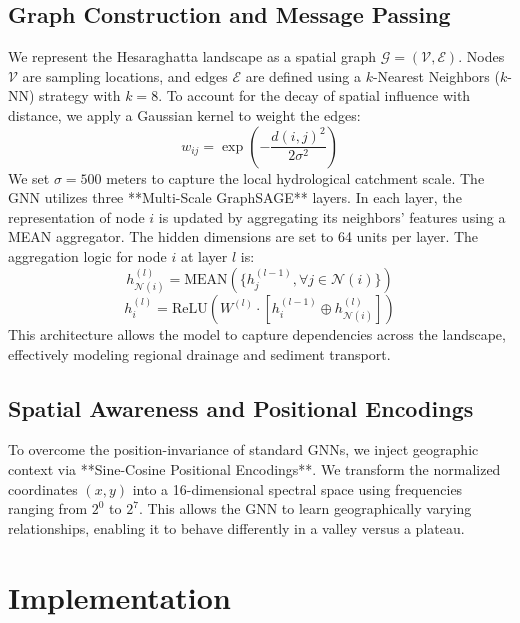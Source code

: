 \documentclass[conference]{IEEEtran}
\begin{document}
\subsection{Graph Construction and Message Passing}
We represent the Hesaraghatta landscape as a spatial graph $\mathcal{G} = (\mathcal{V}, \mathcal{E})$. Nodes $\mathcal{V}$ are sampling locations, and edges $\mathcal{E}$ are defined using a $k$-Nearest Neighbors ($k$-NN) strategy with $k=8$. To account for the decay of spatial influence with distance, we apply a Gaussian kernel to weight the edges:
\begin{equation}
w_{ij} = \exp\left(-\frac{d(i, j)^2}{2\sigma^2}\right)
\end{equation}
We set $\sigma=500$ meters to capture the local hydrological catchment scale. The GNN utilizes three **Multi-Scale GraphSAGE** layers. In each layer, the representation of node $i$ is updated by aggregating its neighbors' features using a MEAN aggregator. The hidden dimensions are set to 64 units per layer. The aggregation logic for node $i$ at layer $l$ is:
\begin{equation}
h_{\mathcal{N}(i)}^{(l)} = \text{MEAN}(\{h_j^{(l-1)}, \forall j \in \mathcal{N}(i)\})
\end{equation}
\begin{equation}
h_i^{(l)} = \text{ReLU}(W^{(l)} \cdot [h_i^{(l-1)} \oplus h_{\mathcal{N}(i)}^{(l)}])
\end{equation}
This architecture allows the model to capture dependencies across the landscape, effectively modeling regional drainage and sediment transport.

\subsection{Spatial Awareness and Positional Encodings}
To overcome the position-invariance of standard GNNs, we inject geographic context via **Sine-Cosine Positional Encodings**. We transform the normalized coordinates $(x, y)$ into a 16-dimensional spectral space using frequencies ranging from $2^0$ to $2^7$. This allows the GNN to learn geographically varying relationships, enabling it to behave differently in a valley versus a plateau.

\section{Implementation}
\end{document}
